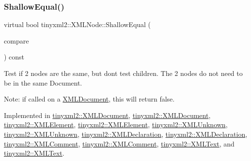 \mbox{\label{classtinyxml2_1_1XMLNode_a7ce18b751c3ea09eac292dca264f9226}} 
\subsubsection{\texorpdfstring{Shallow\+Equal()}{ShallowEqual()}\hspace{0.1cm}{\footnotesize\ttfamily [2/2]}}
{\footnotesize\ttfamily virtual bool tinyxml2\+::\+X\+M\+L\+Node\+::\+Shallow\+Equal (\begin{DoxyParamCaption}\item[{const \hyperlink{classtinyxml2_1_1XMLNode}{X\+M\+L\+Node} $\ast$}]{compare }\end{DoxyParamCaption}) const\hspace{0.3cm}{\ttfamily [pure virtual]}}

Test if 2 nodes are the same, but don\textquotesingle{}t test children. The 2 nodes do not need to be in the same Document.

Note\+: if called on a \hyperlink{classtinyxml2_1_1XMLDocument}{X\+M\+L\+Document}, this will return false. 

Implemented in \hyperlink{classtinyxml2_1_1XMLDocument_a6fe5ef18699091844fcf64b56ffa5bf9}{tinyxml2\+::\+X\+M\+L\+Document}, \hyperlink{classtinyxml2_1_1XMLDocument_a6fe5ef18699091844fcf64b56ffa5bf9}{tinyxml2\+::\+X\+M\+L\+Document}, \hyperlink{classtinyxml2_1_1XMLElement_ad9ea913a460b48979bd83cf9871c99f6}{tinyxml2\+::\+X\+M\+L\+Element}, \hyperlink{classtinyxml2_1_1XMLElement_a61ffd7bf918a9db4aa6203d855ac5ec2}{tinyxml2\+::\+X\+M\+L\+Element}, \hyperlink{classtinyxml2_1_1XMLUnknown_a0715ab2c05d7f74845c188122213b116}{tinyxml2\+::\+X\+M\+L\+Unknown}, \hyperlink{classtinyxml2_1_1XMLUnknown_ac46767cd721d666e690a6231dfb618d1}{tinyxml2\+::\+X\+M\+L\+Unknown}, \hyperlink{classtinyxml2_1_1XMLDeclaration_aa26b70011694e9b9e9480b929e9b78d6}{tinyxml2\+::\+X\+M\+L\+Declaration}, \hyperlink{classtinyxml2_1_1XMLDeclaration_ae8b4d3a399857029f36c322b0801b69c}{tinyxml2\+::\+X\+M\+L\+Declaration}, \hyperlink{classtinyxml2_1_1XMLComment_a6f7d227b25afa8cc3c763b7cc8833739}{tinyxml2\+::\+X\+M\+L\+Comment}, \hyperlink{classtinyxml2_1_1XMLComment_a965d880a99d58dd915caa88dc37a9b51}{tinyxml2\+::\+X\+M\+L\+Comment}, \hyperlink{classtinyxml2_1_1XMLText_ae0fff8a24e2de7eb073fd192e9db0331}{tinyxml2\+::\+X\+M\+L\+Text}, and \hyperlink{classtinyxml2_1_1XMLText_a99d8bce4dc01df889126e047f358cdfc}{tinyxml2\+::\+X\+M\+L\+Text}.


